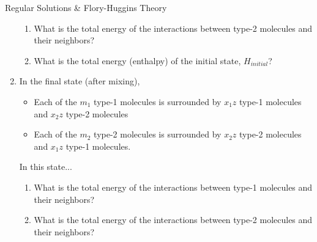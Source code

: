 \begin{activity}{Regular Solutions \& Flory-Huggins Theory}
\begin{exercises}
\begin{enumerate}
\begin{enumerate}
					\item What is the total energy of the interactions between type-2 molecules and their neighbors?
					
						\begin{solution}\end{solution}
				
					\item What is the total energy (enthalpy) of the initial state, $H_{initial}$?
		
					\begin{solution}\end{solution}	
			
				\end{enumerate}

	\item In the final state (after mixing),
	
		\begin{itemize}[topsep=3pt,itemsep=0pt]
			\item Each of the $m_1$ type-1 molecules is surrounded by $x_1 z$ type-1 molecules and $x_2 z$ type-2 molecules
			\item Each of the $m_2$ type-2 molecules is surrounded by $x_2 z$ type-2 molecules and $x_1 z$ type-1 molecules.
		\end{itemize}
		In this state...
		
		\begin{enumerate}
			\item What is the total energy of the interactions between type-1 molecules and their neighbors?
			
				\begin{solution}\end{solution}
				
			\item What is the total energy of the interactions between type-2 molecules and their neighbors?
			
				\begin{solution}\end{solution}
				

\end{enumerate}
\end{enumerate}
\end{exercises}
\end{activity}
